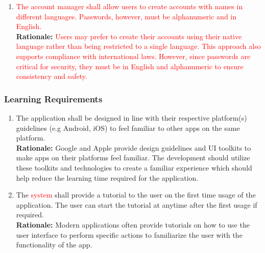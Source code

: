 \documentclass{article}
\begin{document}
\begin{enumerate}[{UH-PI}1. ]
	\item \textcolor{red} {The account manager shall allow users to create accounts with names in different languages. Passwords, however, must be alphanumeric and in English.}\\
	\textbf{Rationale:} \textcolor{red} {Users may prefer to create their accounts using their native language rather than being restricted to a single language. This approach also supports compliance with international laws. However, since passwords are critical for security, they must be in English and alphanumeric to ensure consistency and safety.}\\
\end{enumerate}

\subsubsection{Learning Requirements}
\label{ssub:learning_requirements}
\begin{enumerate}[{UH-L}1. ]
	\item The application shall be designed in line with their respective platform(s) guidelines (e.g Android, iOS) to feel familiar to other apps on the same platform.\\
	\textbf{Rationale:} Google and Apple provide design guidelines and UI toolkits to make apps on their platforms feel familiar. The development should utilize these toolkits
	and technologies to create a familiar experience which should help reduce the learning time required for the application.
	\item The \textcolor{red}{system} shall provide a tutorial to the user on the first time usage of the application. The user can start the tutorial at anytime after the first usage if required.\\
	\textbf{Rationale:} Modern applications often provide tutorials on how to use the user interface to perform specific actions to familiarize the user with the functionality of the app.
\end{enumerate}
\end{document}
